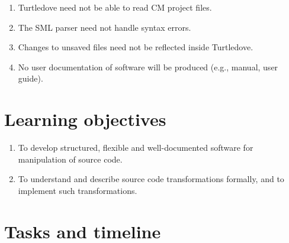 \documentclass[a4paper,oneside]{article}
\begin{document}
\begin{enumerate}
\item Turtledove need not be able to read CM project files.

\item The SML parser need not handle syntax errors.

\item Changes to unsaved files need not be reflected inside Turtledove.

\item No user documentation of software will be produced (e.g., manual, user guide).
\end{enumerate}

\section{Learning objectives}

\begin{enumerate}
\item To develop structured, flexible and well-documented software for
      manipulation of source code.
\item To understand and describe source code transformations formally, and to implement such
      transformations.
\end{enumerate}

\section{Tasks and timeline}
\end{document}
